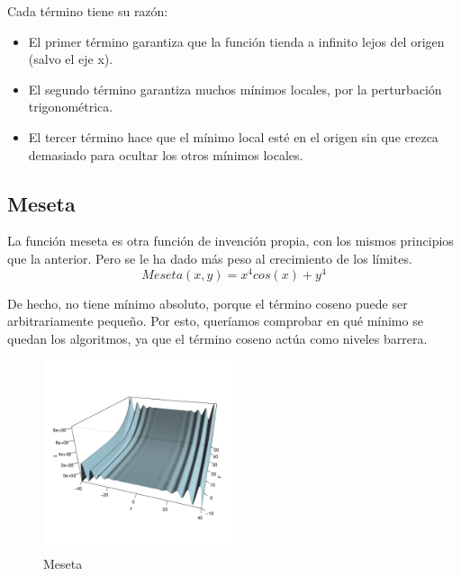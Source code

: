 \documentclass[10pt]{article}
\theoremstyle{definition}
\begin{document}
Cada término tiene su razón: 
\begin{itemize}[noitemsep,nolistsep,topsep=0pt,partopsep=0pt,leftmargin=4ex,label=\textbullet]
\item El primer término garantiza que la función tienda a infinito
  lejos del origen (salvo el eje x).
\item El segundo término garantiza muchos mínimos locales, por la
  perturbación trigonométrica. 
\item El tercer término hace que el mínimo local esté en el origen sin
  que crezca demasiado para ocultar los otros mínimos locales.
\end{itemize}

\subsection{Meseta} \label{sub:fun-meseta}


La función meseta es otra función de invención propia, con los mismos principios
que la anterior. Pero se le ha dado más peso al crecimiento de los límites.
\begin{displaymath}
	Meseta(x,y)=x^4cos(x)+y^4
\end{displaymath}

De hecho, no tiene mínimo absoluto, porque el término coseno puede ser
arbitrariamente pequeño. Por esto, queríamos comprobar en qué mínimo
se quedan los algoritmos, ya que el término coseno actúa como niveles
barrera.

\begin{figure}[H]\centering%
  \vspace{-3em}%
  \includegraphics[width=0.5\textwidth]{../theoretic_study/func_valley/meseta.pdf}
  \vspace{-3em}%
  \caption{Meseta}
\end{figure}
\end{document}
